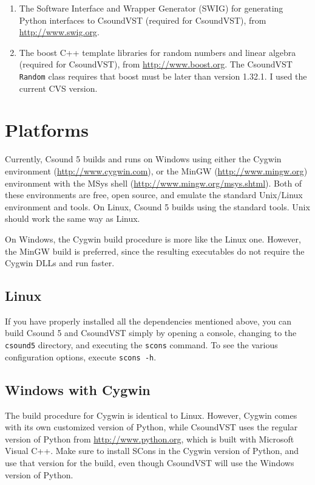 \documentclass[10pt,letterpaper,onecolumn]{book}
\begin{document}
\begin{enumerate}
\item The Software Interface and Wrapper Generator (SWIG) for generating Python interfaces to CsoundVST (required for CsoundVST), from \url{http://www.swig.org}.
\item The boost C++ template libraries for random numbers and linear algebra (required for CsoundVST), from \url{http://www.boost.org}. The CsoundVST \texttt{Random} class requires that boost must be later than version 1.32.1. I used the current CVS version.
\end{enumerate}

\section{Platforms}

Currently, Csound 5 builds and runs on Windows using either the Cygwin environment (\url{http://www.cygwin.com}), or the MinGW  (\url{http://www.mingw.org}) environment with the MSys shell (\url{http://www.mingw.org/msys.shtml}). Both of these environments are free, open source, and emulate the standard Unix/Linux environment and tools. On Linux, Csound 5 builds using the standard tools. Unix should work the same way as Linux.

On Windows, the Cygwin build procedure is more like the Linux one. However, the MinGW build is preferred, since the resulting executables do not require the Cygwin DLLs and run faster.

\subsection{Linux}

If you have properly installed all the dependencies mentioned above, you can build Csound 5 and CsoundVST simply by opening a console, changing to the \texttt{csound5} directory, and executing the \texttt{scons} command. To see the various configuration options, execute \texttt{scons -h}.

\subsection{Windows with Cygwin}

The build procedure for Cygwin is identical to Linux. However, Cygwin comes with its own customized version of Python, while CsoundVST uses the regular version of Python from \url{http://www.python.org}, which is built with Microsoft Visual C++. Make sure to install SCons in the Cygwin version of Python, and use that version for the build, even though CsoundVST will use the Windows version of Python.
\end{document}
